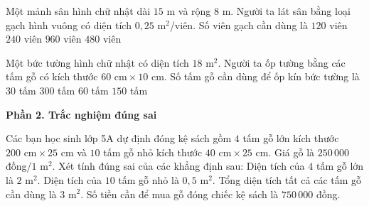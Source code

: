 \begin{ex} %
Một mảnh sân hình chữ nhật dài $15\text{ m}$ và rộng $8\text{ m}$. Người ta lát sân bằng loại gạch hình vuông có diện tích $0{,}25\text{ m}^2$/viên. Số viên gạch cần dùng là
\choice
{$120$ viên}
{$240$ viên}
{$960$ viên}
{\True $480$ viên}
\end{ex}

\begin{ex} %
Một bức tường hình chữ nhật có diện tích $18\text{ m}^2$. Người ta ốp tường bằng các tấm gỗ có kích thước $60\text{ cm} \times 10\text{ cm}$. Số tấm gỗ cần dùng để ốp kín bức tường là
\choice
{$30$ tấm}
{\True $300$ tấm}
{$60$ tấm}
{$150$ tấm}
\end{ex}

\textbf{Phần 2. Trắc nghiệm đúng sai}

\begin{ex} %
Các bạn học sinh lớp 5A dự định đóng kệ sách gồm $4$ tấm gỗ lớn kích thước $200\text{ cm} \times 25\text{ cm}$ và $10$ tấm gỗ nhỏ kích thước $40\text{ cm} \times 25\text{ cm}$. Giá gỗ là $250\,000$ đồng/$1\text{ m}^2$. Xét tính đúng sai của các khẳng định sau:
\choiceTF
{\True Diện tích của $4$ tấm gỗ lớn là $2\text{ m}^2$.}
{Diện tích của $10$ tấm gỗ nhỏ là $0{,}5\text{ m}^2$.}
{\True Tổng diện tích tất cả các tấm gỗ cần dùng là $3\text{ m}^2$.}
{\True Số tiền cần để mua gỗ đóng chiếc kệ sách là $750\,000$ đồng.}
\end{ex}

